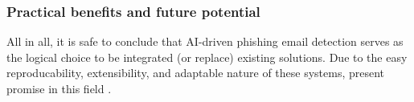
\subsubsection*{Practical benefits and future potential}
All in all, it is safe to conclude that AI-driven phishing email detection serves as the logical choice to be integrated (or replace) existing solutions. Due to the easy reproducability, extensibility, and adaptable nature of these systems, present promise in this field \citep{bauskar2024ai}.
